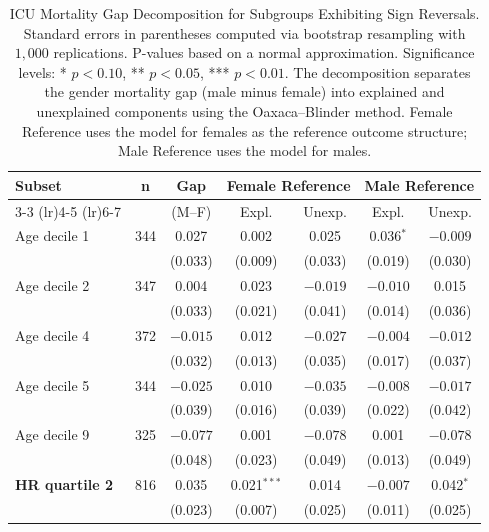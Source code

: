 \begin{table}[H]
    \centering
    \caption{ICU Mortality Gap Decomposition for Subgroups Exhibiting Sign Reversals. Standard errors in parentheses computed via bootstrap resampling with $1{,}000$ replications.  
    P-values based on a normal approximation.  
    Significance levels: * $p<0.10$, ** $p<0.05$, *** $p<0.01$.  
    The decomposition separates the gender mortality gap (male minus female) into explained and unexplained components using the Oaxaca--Blinder method.  
    Female Reference uses the model for females as the reference outcome structure; Male Reference uses the model for males.}
    \label{tab:icu_mortality}
    \scriptsize
    \begin{tabular}{@{}lc*{5}{c}@{}}
    \toprule
    \multirow{2}{*}{Subset} &
    \multirow{2}{*}{n} &
    Gap &
    \multicolumn{2}{c}{Female Reference} &
    \multicolumn{2}{c}{Male Reference} \\
    \cmidrule(lr){3-3} \cmidrule(lr){4-5} \cmidrule(lr){6-7}
    & & (M–F) & Expl. & Unexp. & Expl. & Unexp. \\
    \midrule
    
    Age decile 1 & 344 & 0.027 & 0.002 & 0.025 & 0.036$^{*}$ & $-0.009$ \\
    & & (0.033) & (0.009) & (0.033) & (0.019) & (0.030) \\[0.3em]
    
    Age decile 2 & 347 & 0.004 & 0.023 & $-0.019$ & $-0.010$ & 0.015 \\
    & & (0.033) & (0.021) & (0.041) & (0.014) & (0.036) \\[0.3em]
    
    Age decile 4 & 372 & $-0.015$ & 0.012 & $-0.027$ & $-0.004$ & $-0.012$ \\
    & & (0.032) & (0.013) & (0.035) & (0.017) & (0.037) \\[0.3em]
    
    Age decile 5 & 344 & $-0.025$ & 0.010 & $-0.035$ & $-0.008$ & $-0.017$ \\
    & & (0.039) & (0.016) & (0.039) & (0.022) & (0.042) \\[0.3em]
    
    Age decile 9 & 325 & $-0.077$ & 0.001 & $-0.078$ & 0.001 & $-0.078$ \\
    & & (0.048) & (0.023) & (0.049) & (0.013) & (0.049) \\[0.3em]
    
    \textbf{HR quartile 2} & 816 & 0.035 & 0.021$^{***}$ & 0.014 & $-0.007$ & 0.042$^{*}$ \\
    & & (0.023) & (0.007) & (0.025) & (0.011) & (0.025) \\[0.3em]
    

\end{tabular}
\end{table}
